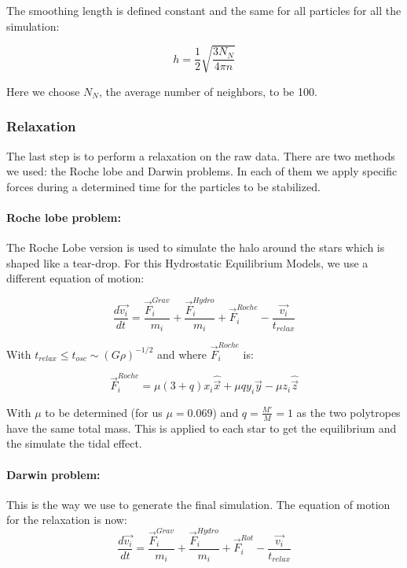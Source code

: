 The smoothing length is defined constant and the same for all particles for all the simulation:

$$ h = \frac{1}{2}\sqrt{\frac{3N_N}{4\pi n}} $$ 

Here we choose $N_N$, the average number of neighbors, to be 100.

\subsubsection{Relaxation}
The last step is to perform a relaxation on the raw data. 
There are two methods we used: the Roche lobe and Darwin problems. 
In each of them we apply specific forces during a determined time for the particles to be stabilized. 

\paragraph{Roche lobe problem: }
The Roche Lobe version is used to simulate the halo around the stars which is shaped like a tear-drop. 
For this Hydrostatic Equilibrium Models, we use a different equation of motion:

\begin{equation}
\frac{d\vec{v_i}}{dt} = \frac{\vec{F}_i^{Grav}}{m_i} + \frac{\vec{F}_i^{Hydro}}{m_i} + \vec{F}_i^{Roche} - \frac{\vec{v_i}}{t_{relax}}
\end{equation}

 
With $t_{relax} \leq t_{osc} \sim (G\rho)^{-1/2}$ and 
where $\vec{F}_i^{Roche}$ is:

$$\vec{F}_i^{Roche} = \mu (3+q) x_i \hat{\vec{x}} + \mu q y_i \hat{\vec{y}}-\mu z_i \hat{\vec{z}}$$ 

With $\mu$ to be determined (for us $\mu = 0.069$) and $q = \frac{M'}{M}=1$ as the two polytropes have the same total mass.
This is applied to each star to get the equilibrium and the simulate the tidal effect. 

\paragraph{Darwin problem: }
This is the way we use to generate the final simulation. 
The equation of motion for the relaxation is now: 
\begin{equation}
\label{eq:darwin}
\frac{d\vec{v_i}}{dt} = \frac{\vec{F}_i^{Grav}}{m_i} +\frac{\vec{F}_i^{Hydro}}{m_i} + \vec{F}_i^{Rot} - \frac{\vec{v_i}}{t_{relax}}
\end{equation}

